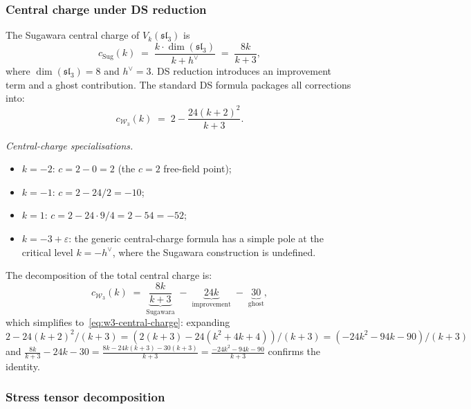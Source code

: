 \subsubsection{Central charge under DS reduction}

\begin{computation}
\label{comp:w3-central-charge}
%
The Sugawara central charge of $V_k(\mathfrak{sl}_3)$ is
\[
c_{\mathrm{Sug}}(k)
\;=\; \frac{k \cdot \dim(\mathfrak{sl}_3)}{k + h^\vee}
\;=\; \frac{8k}{k + 3},
\]
where $\dim(\mathfrak{sl}_3) = 8$ and $h^\vee = 3$.
DS reduction introduces an improvement term and a
ghost contribution. The standard DS formula packages all
corrections into:
\begin{equation}
\label{eq:w3-central-charge}
c_{\mathcal{W}_3}(k)
\;=\; 2 - \frac{24(k+2)^2}{k+3}.
\end{equation}

\emph{Central-charge specialisations.}
\begin{itemize}
\item $k = -2$: $c = 2 - 0 = 2$ (the $c = 2$ free-field point);
\item $k = -1$: $c = 2 - 24/2 = -10$;
\item $k = 1$: $c = 2 - 24 \cdot 9/4 = 2 - 54 = -52$;
\item $k = -3 + \varepsilon$: the generic central-charge formula has a
 simple pole at the critical level $k = -h^\vee$, where the Sugawara
 construction is undefined.
\end{itemize}

The decomposition of the total central charge is:
\begin{equation}
\label{eq:w3-cc-decomposition}
c_{\mathcal{W}_3}(k)
\;=\;
\underbrace{\frac{8k}{k+3}}_{\text{Sugawara}}
\;-\;
\underbrace{24k}_{\text{improvement}}
\;-\;
\underbrace{30}_{\text{ghost}},
\end{equation}
which simplifies to~\eqref{eq:w3-central-charge}: expanding
$2 - 24(k+2)^2/(k+3)
= (2(k+3) - 24(k^2+4k+4))/(k+3)
= (-24k^2 - 94k - 90)/(k+3)$
and $\frac{8k}{k+3} - 24k - 30
= \frac{8k - 24k(k+3) - 30(k+3)}{k+3}
= \frac{-24k^2 - 94k - 90}{k+3}$
confirms the identity.
\end{computation}

\subsubsection{Stress tensor decomposition}

